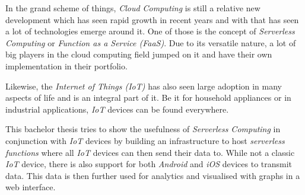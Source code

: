 In the grand scheme of things, \textit{Cloud Computing} is still a relative new development which
has seen rapid growth in recent years and with that has seen a lot of technologies emerge around it.
One of those is the concept of \textit{Serverless Computing} or \textit{Function as a Service
(FaaS)}. Due to its versatile nature, a lot of big players in the cloud computing field jumped on it
and have their own implementation in their portfolio.

Likewise, the \textit{Internet of Things (IoT)} has also seen large adoption in many aspects of life
and is an integral part of it. Be it for household appliances or in industrial applications,
\textit{IoT} devices can be found everywhere.

This bachelor thesis tries to show the usefulness of \textit{Serverless Computing} in conjunction
with \textit{IoT} devices by building an infrastructure to host \textit{serverless functions} where
all \textit{IoT} devices can then send their data to. While not a classic \textit{IoT} device, there
is also support for both \textit{Android} and \textit{iOS} devices to transmit data. This data is
then further used for analytics and visualised with graphs in a web interface.
